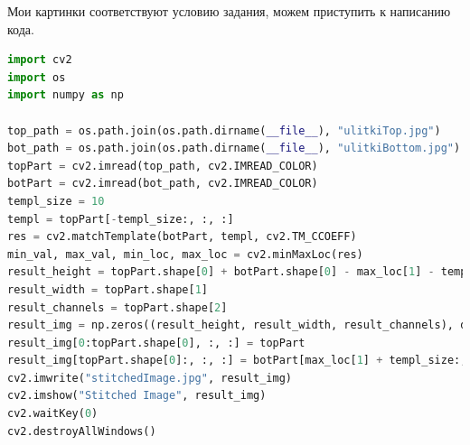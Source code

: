 \documentclass[a4paper,12pt]{article}
\begin{document}
Мои картинки соответствуют условию задания, можем приступить к написанию кода.


\begin{lstlisting}[language=Python, caption=Сшивка изображений]
import cv2
import os
import numpy as np

top_path = os.path.join(os.path.dirname(__file__), "ulitkiTop.jpg")
bot_path = os.path.join(os.path.dirname(__file__), "ulitkiBottom.jpg")
topPart = cv2.imread(top_path, cv2.IMREAD_COLOR)
botPart = cv2.imread(bot_path, cv2.IMREAD_COLOR)
templ_size = 10
templ = topPart[-templ_size:, :, :]
res = cv2.matchTemplate(botPart, templ, cv2.TM_CCOEFF)
min_val, max_val, min_loc, max_loc = cv2.minMaxLoc(res)
result_height = topPart.shape[0] + botPart.shape[0] - max_loc[1] - templ_size
result_width = topPart.shape[1]
result_channels = topPart.shape[2]
result_img = np.zeros((result_height, result_width, result_channels), dtype=np.uint8)
result_img[0:topPart.shape[0], :, :] = topPart
result_img[topPart.shape[0]:, :, :] = botPart[max_loc[1] + templ_size:, :, :]
cv2.imwrite("stitchedImage.jpg", result_img)
cv2.imshow("Stitched Image", result_img)
cv2.waitKey(0)
cv2.destroyAllWindows()
\end{lstlisting}    
\end{document}
